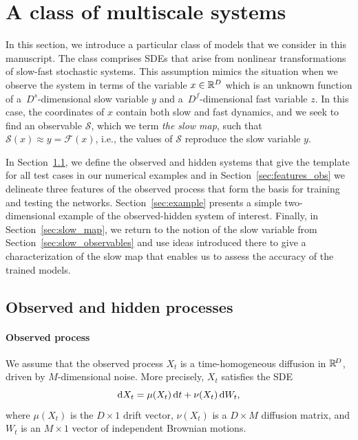 \documentclass{article}
\newcommand{\obs}{\mathcal{F}} %
\newcommand{\smap}{\mathcal{S}} %
\begin{document}
\section{A class of multiscale systems}\label{sec:ms_class}
In this section, we introduce a particular class of models that we consider in this manuscript. The class comprises SDEs that arise from nonlinear transformations of slow-fast stochastic systems. This assumption mimics the situation when we observe the system in terms of the variable $x\in\mathbb{R}^D$ which is an unknown function of a~$D^s$-dimensional slow variable $y$ and a~$D^f$-dimensional fast variable $z$. In this case, the coordinates of $x$ contain both slow and fast dynamics, and we seek to find an observable $\smap$, which we term \emph{the slow map}, such that $\smap(x)\approx y=\obs(x)$, i.e., the values of $\smap$ reproduce the slow variable $y$.

In Section~\ref{sec:obs_hid}, we define the observed and hidden systems that give the template for all test cases in our numerical examples and in Section~\ref{sec:features_obs} we delineate three features of the observed process that form the basis for training and testing the networks. Section~\ref{sec:example} presents a simple two-dimensional example of the observed-hidden system of interest. Finally, in Section~\ref{sec:slow_map}, we return to the notion of the slow variable from Section~\ref{sec:slow_observables} and use ideas introduced there to give a characterization of the slow map that enables us to assess the accuracy of the trained models.

\subsection{Observed and hidden processes}
\label{sec:obs_hid}

\paragraph{Observed process}
We assume that the observed process $X_t$ is a time-homogeneous diffusion in $\mathbb{R}^{\!D}$, driven by $M$-dimensional noise. More precisely, $X_t$ satisfies the SDE
\begin{equation}\label{eq:obs_sde}
    \operatorname{d}\!{X_t} = \mu(X_t)\operatorname{d}\!{t} + \nu(X_t)\operatorname{d}\!{W_t},
\end{equation}
where $\mu(X_t)$ is the $D\times1$ drift vector, $\nu(X_t)$ is a $D\times M$ diffusion matrix, and $W_t$ is an $M\times1$ vector of independent Brownian motions.
\end{document}
